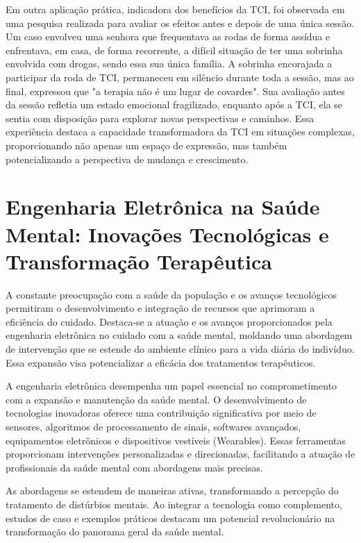 Em outra aplicação prática, indicadora dos benefícios da TCI, foi observada em uma pesquisa realizada para avaliar os efeitos antes e depois de uma única sessão. Um caso envolveu uma senhora que frequentava as rodas de forma assídua e enfrentava, em casa, de forma recorrente, a difícil situação de ter uma sobrinha envolvida com drogas, sendo essa sua única família. A sobrinha encorajada a participar da roda de TCI, permaneceu em silêncio durante toda a sessão, mas ao final, expressou que "a terapia não é um lugar de covardes". Sua avaliação antes da sessão refletia um estado emocional fragilizado, enquanto após a TCI, ela se sentia com disposição para explorar novas perspectivas e caminhos.\cite{LEITEePALOS} Essa experiência destaca a capacidade transformadora da TCI em situações complexas, proporcionando não apenas um espaço de expressão, mas também potencializando a perspectiva de mudança e crescimento. 



\chapter{Engenharia Eletrônica na Saúde Mental: Inovações Tecnológicas e Transformação Terapêutica}
A constante preocupação com a saúde da população e os avanços tecnológicos permitiram o desenvolvimento e integração de recursos que aprimoram a eficiência do cuidado. Destaca-se a atuação e os avanços proporcionados pela engenharia eletrônica no cuidado com a saúde mental, moldando uma abordagem de intervenção que se estende do ambiente clínico para a vida diária do indivíduo. Essa expansão visa potencializar a eficácia dos tratamentos terapêuticos.

A engenharia eletrônica desempenha um papel essencial no comprometimento com a expansão e manutenção da saúde mental. O desenvolvimento de tecnologias inovadoras oferece uma contribuição significativa por meio de sensores, algoritmos de processamento de sinais, softwares avançados, equipamentos eletrônicos e dispositivos vestíveis (Wearables). Essas ferramentas proporcionam intervenções personalizadas e direcionadas, facilitando a atuação de profissionais da saúde mental com abordagens mais precisas.

As abordagens se estendem de maneiras ativas, transformando a percepção do tratamento de distúrbios mentais. Ao integrar a tecnologia como complemento, estudos de caso e exemplos práticos destacam um potencial revolucionário na transformação do panorama geral da saúde mental.

